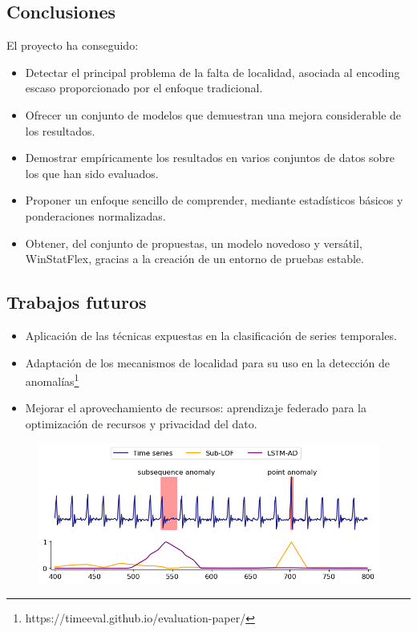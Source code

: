 \documentclass[compress]{beamer}
\begin{document}
\subsection{Conclusiones}
\begin{frame}{}
		El proyecto ha conseguido:
		\begin{itemize}
			\item Detectar el principal problema de la falta de localidad, asociada al encoding escaso proporcionado por el enfoque tradicional.
			\item Ofrecer un conjunto de modelos que demuestran una mejora considerable de los resultados.
			\item Demostrar empíricamente los resultados en varios conjuntos de datos sobre los que han sido evaluados.
			\item Proponer un enfoque sencillo de comprender,  mediante estadísticos básicos y ponderaciones normalizadas.
			\item Obtener, del conjunto de propuestas, un modelo novedoso y versátil, WinStatFlex, gracias a la creación de un entorno de pruebas estable.
		\end{itemize}
	
\end{frame}


\subsection{Trabajos futuros}
\begin{frame}{}

\begin{itemize}
	\item Aplicación de las técnicas expuestas en la clasificación de series temporales.
	\item Adaptación de los mecanismos de localidad para su uso en la detección de anomalías\footnote{https://timeeval.github.io/evaluation-paper/}
	\item Mejorar el aprovechamiento de recursos: aprendizaje federado para la optimización de recursos y privacidad del dato.
\end{itemize}


\begin{figure}
	\includegraphics[scale=0.3]{pic/anomaly.png}
\end{figure}
	
\end{frame}
\end{document}

